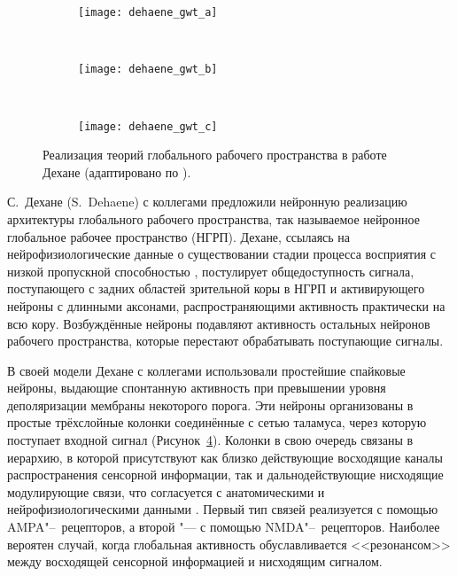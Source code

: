 \begin{figure}[h]
	\centering
	\begin{subfigure}[b]{0.3\textwidth}
		\texttt{[image: dehaene\_gwt\_a]}
		\caption{}
		\label{fg:dehaene_gwt_a}
	\end{subfigure}
	~ 
	\begin{subfigure}[b]{0.3\textwidth}
		\texttt{[image: dehaene\_gwt\_b]}
		\caption{}
		\label{fg:dehaene_gwt_b}
	\end{subfigure}
	~ 
	\begin{subfigure}[b]{0.3\textwidth}
		\texttt{[image: dehaene\_gwt\_c]}
		\caption{}
		\label{fg:dehaene_gwt_c}
	\end{subfigure}
	\caption{Реализация теорий глобального рабочего пространства в работе Дехане (адаптировано по \cite{Dehaene2003}).}
	\label{fg:dehaene_gwt}
\end{figure}

С.~Дехане (S.~Dehaene) с коллегами \cite{Dehaene2003} предложили нейронную реализацию архитектуры глобального рабочего пространства, так называемое нейронное глобальное рабочее пространство (НГРП). Дехане, ссылаясь на нейрофизиологические данные о существовании стадии процесса восприятия с низкой пропускной способностью \cite{Chun1995}, постулирует общедоступность сигнала, поступающего с задних областей зрительной коры в НГРП и активирующего нейроны с длинными аксонами, распространяющими активность практически на всю кору. Возбуждённые нейроны подавляют активность остальных нейронов рабочего пространства, которые перестают обрабатывать поступающие сигналы. 

В своей модели Дехане с коллегами использовали простейшие спайковые нейроны, выдающие спонтанную активность при превышении уровня деполяризации мембраны некоторого порога. Эти нейроны организованы в простые трёхслойные колонки соединённые с сетью таламуса, через которую поступает входной сигнал (Рисунок~\ref{fg:dehaene_gwt}). Колонки в свою очередь связаны в иерархию, в которой присутствуют как близко действующие восходящие каналы распространения сенсорной информации, так и дальнодействующие нисходящие модулирующие связи, что согласуется с анатомическими и нейрофизиологическими данными \cite{Lamme2000,Felleman1991}. Первый тип связей реализуется с помощью AMPA"--~рецепторов, а второй "--- с помощью NMDA"--~рецепторов. Наиболее вероятен случай, когда глобальная активность обуславливается <<резонансом>> \cite{Llinas1998} между восходящей сенсорной информацией и нисходящим сигналом.

